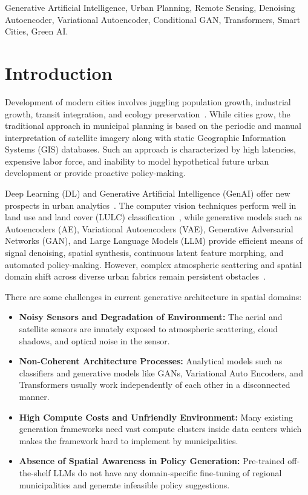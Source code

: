 \documentclass[conference]{IEEEtran}
\begin{document}
\begin{IEEEkeywords}
Generative Artificial Intelligence, Urban Planning, Remote Sensing, Denoising Autoencoder, Variational Autoencoder, Conditional GAN, Transformers, Smart Cities, Green AI.
\end{IEEEkeywords}

\section{Introduction}
Development of modern cities involves juggling population growth, industrial growth, transit integration, and ecology preservation~\cite{weng2002remote,batty2013new,benediktsson2015remote}. While cities grow, the traditional approach in municipal planning is based on the periodic and manual interpretation of satellite imagery along with static Geographic Information Systems (GIS) databases. Such an approach is characterized by high latencies, expensive labor force, and inability to model hypothetical future urban development or provide proactive policy-making.

Deep Learning (DL) and Generative Artificial Intelligence (GenAI) offer new prospects in urban analytics~\cite{lecun2015deep,zhu2017deep}. The computer vision techniques perform well in land use and land cover (LULC) classification~\cite{cheng2017remote,yang2010bag,long2015fully}, while generative models such as Autoencoders (AE), Variational Autoencoders (VAE), Generative Adversarial Networks (GAN), and Large Language Models (LLM) provide efficient means of signal denoising, spatial synthesis, continuous latent feature morphing, and automated policy-making. However, complex atmospheric scattering and spatial domain shift across diverse urban fabrics remain persistent obstacles~\cite{tuia2016domain}.

There are some challenges in current generative architecture in spatial domains:
\begin{itemize}
    \item \textbf{Noisy Sensors and Degradation of Environment:} The aerial and satellite sensors are innately exposed to atmospheric scattering, cloud shadows, and optical noise in the sensor.
    \item \textbf{Non-Coherent Architecture Processes:} Analytical models such as classifiers and generative models like GANs, Variational Auto Encoders, and Transformers usually work independently of each other in a disconnected manner.
    \item \textbf{High Compute Costs and Unfriendly Environment:} Many existing generation frameworks need vast compute clusters inside data centers which makes the framework hard to implement by municipalities.
    \item \textbf{Absence of Spatial Awareness in Policy Generation:} Pre-trained off-the-shelf LLMs do not have any domain-specific fine-tuning of regional municipalities and generate infeasible policy suggestions.
\end{itemize}
\end{document}
